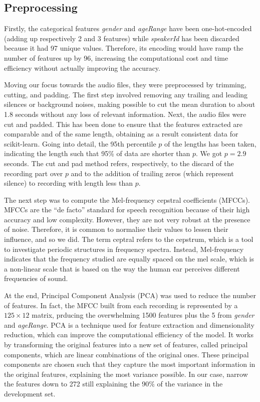 \documentclass[conference]{IEEEtran}
\begin{document}
\subsection{Preprocessing}

Firstly, the categorical features \textit{gender} and \textit{ageRange} have been one-hot-encoded (adding up respectively 2 and 3 features) while \textit{speakerId} has been discarded because it had 97 unique values.
Therefore, its encoding would have ramp the number of features up by 96, increasing the computational cost and time efficiency without actually improving the accuracy.

Moving our focus towards the audio files, they were preprocessed by trimming, cutting, and padding.
The first step involved removing any trailing and leading silences or background noises, making possible to cut the mean duration to about 1.8 seconds without any loss of relevant information.
Next, the audio files were cut and padded.
This has been done to ensure that the features extracted are comparable and of the same length, obtaining as a result consistent data for scikit-learn.
Going into detail, the 95th percentile $p$ of the lengths has been taken, indicating the length such that 95\% of data are shorter than $p$.
We got $p = 2.9$ seconds.
The cut and pad method refers, respectively, to the discard of the recording part over $p$ and to the addition of trailing zeros (which represent silence) to recording with length less than $p$.

The next step was to compute the Mel-frequency cepstral coefficients (MFCCs).
MFCCs are the “de facto” standard for speech recognition because of their high accuracy and low complexity.
However, they are not very robust at the presence of noise.
Therefore, it is common to normalise their values to lessen their influence, and so we did.
The term ceptral refers to the cepstrum, which is a tool to investigate periodic structures in frequency spectra.
Instead, Mel-frequency indicates that the frequency studied are equally spaced on the mel scale, which is a non-linear scale that is based on the way the human ear perceives different frequencies of sound.

At the end, Principal Component Analysis (PCA) was used to reduce the number of features.
In fact, the MFCC built from each recording is represented by a $125 \times 12$ matrix, prducing the overwhelming 1500 features plus the 5 from \textit{gender} and \textit{ageRange}.
PCA is a technique used for feature extraction and dimensionality reduction, which can improve the computational efficiency of the model.
It works by transforming the original features into a new set of features, called principal components, which are linear combinations of the original ones.
These principal components are chosen such that they capture the most important information in the original features, explaining the most variance possible.
In our case, narrow the features down to 272 still explaining the 90\% of the variance in the development set.
\end{document}

